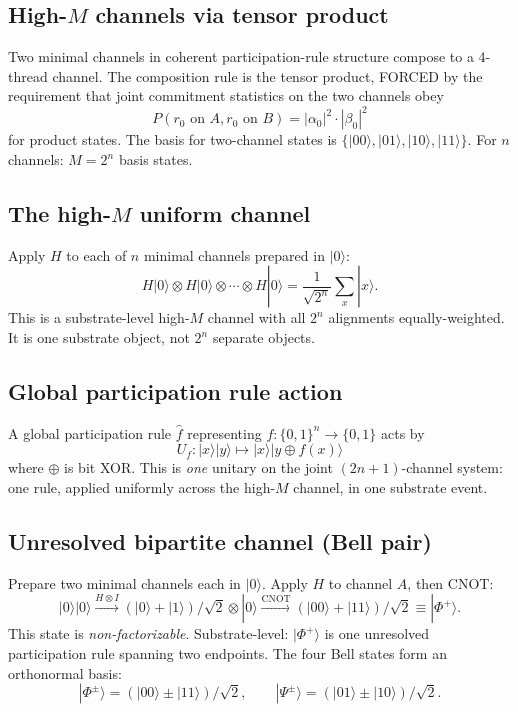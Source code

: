\documentclass[11pt,a4paper]{article}
\begin{document}
\subsection{High-$M$ channels via tensor product}

Two minimal channels in coherent participation-rule structure compose to a 4-thread channel. The composition rule is the tensor product, FORCED by the requirement that joint commitment statistics on the two channels obey
\[
P(r_0\text{ on } A, r_0\text{ on } B) = |\alpha_0|^2 \cdot |\beta_0|^2
\]
for product states. The basis for two-channel states is $\{|00\rangle, |01\rangle, |10\rangle, |11\rangle\}$. For $n$ channels: $M = 2^n$ basis states.

\subsection{The high-$M$ uniform channel}

Apply $H$ to each of $n$ minimal channels prepared in $|0\rangle$:
\[
H|0\rangle \otimes H|0\rangle \otimes \cdots \otimes H|0\rangle = \frac{1}{\sqrt{2^n}}\sum_x |x\rangle.
\]
This is a substrate-level high-$M$ channel with all $2^n$ alignments equally-weighted. It is one substrate object, not $2^n$ separate objects.

\subsection{Global participation rule action}

A global participation rule $\hat f$ representing $f: \{0,1\}^n \to \{0,1\}$ acts by
\[
U_f: |x\rangle|y\rangle \mapsto |x\rangle|y \oplus f(x)\rangle
\]
where $\oplus$ is bit XOR. This is \emph{one} unitary on the joint $(2n+1)$-channel system: one rule, applied uniformly across the high-$M$ channel, in one substrate event.

\subsection{Unresolved bipartite channel (Bell pair)}

Prepare two minimal channels each in $|0\rangle$. Apply $H$ to channel $A$, then CNOT:
\[
|0\rangle|0\rangle \xrightarrow{H \otimes I} (|0\rangle + |1\rangle)/\sqrt{2} \otimes |0\rangle \xrightarrow{\mathrm{CNOT}} (|00\rangle + |11\rangle)/\sqrt{2} \equiv |\Phi^+\rangle.
\]
This state is \emph{non-factorizable}. Substrate-level: $|\Phi^+\rangle$ is one unresolved participation rule spanning two endpoints. The four Bell states form an orthonormal basis:
\[
|\Phi^\pm\rangle = (|00\rangle \pm |11\rangle)/\sqrt{2}, \qquad |\Psi^\pm\rangle = (|01\rangle \pm |10\rangle)/\sqrt{2}.
\]
\end{document}
